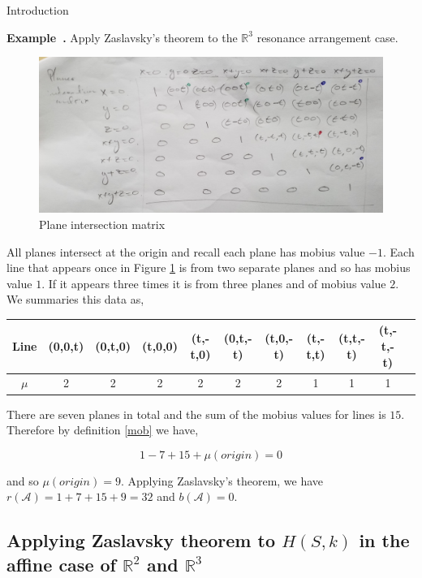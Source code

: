 \documentclass[a4paper,12pt]{article}
\newcounter{example}[]
\newenvironment{example}[1][]{\refstepcounter{example}\par\medskip
   \noindent \textbf{Example~\theexample. #1} \rmfamily}{\medskip}
\theoremstyle{definition}
\theoremstyle{indented}
\begin{document}
\begin{section}{Introduction}
\begin{example}
Apply Zaslavsky's theorem to the $\mathbb{R}^3$ resonance arrangement case.

\begin{figure}[H]
    \centering
 \includegraphics[scale=0.10,angle=0]{29072020 pics/resplaneeintersect.jpg}  
    \caption{Plane intersection matrix }
    \label{res}
\end{figure}



All planes intersect at the origin and recall each plane has mobius value $-1$. Each line that appears once in Figure \ref{res} is from two separate planes and so has mobius value $1$. If it appears three times it is from three planes and of mobius value $2$. We summaries this data as,

\begin{center}
\begin{tabular}{ |c|c|c|c|c|c|c|c|c|c|c| } 
 \hline
Line &(0,0,t)& (0,t,0)& (t,0,0) & (t,-t,0) & (0,t,-t) & (t,0,-t) & (t,-t,t) & (t,t,-t) & (t,-t,-t) \\ 
\hline
$\mu$ &2& 2& 2& 2& 2& 2 & 1 & 1 &1\\
\hline

 \hline
\end{tabular}
  \caption{} \label{tab:sometab}
\end{center}

There are seven planes in total and the sum of the mobius values for lines is $15$. Therefore by definition \ref{mob} we have, 

$$ 1 - 7 +15 + \mu(origin)=0$$

and so $\mu(origin)=9$. Applying Zaslavsky's theorem, we have $r(\mathcal{A})= 1+7+15+9=32$ and $b(\mathcal{A})=0$. 

\end{example}



 \section{Applying Zaslavsky theorem to $H(S,k)$ in the affine case of $\mathbb{R}^2$ and $\mathbb{R}^3$}


\end{section}
\end{document}

